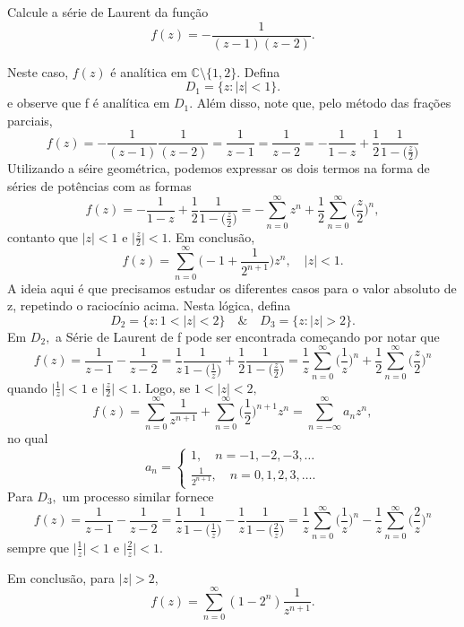 \documentclass[ComplexAnalysis/complex.tex]{subfiles}
\begin{document}
\begin{example}
	Calcule a série de Laurent da função
	\[
		f(z) = -\frac{1}{(z-1)(z-2)}.
	\]

	Neste caso, \(f(z)\) é analítica em \(\mathbb{C}\setminus{\{1, 2\}}.\) Defina
	\[
		D_{1} = \{z:|z| < 1\}.
	\]
	e observe que f é analítica em \(D_{1}.\) Além disso, note que, pelo método das frações parciais,
	\[
		f(z) = -\frac{1}{(z-1)}\frac{1}{(z-2)} = \frac{1}{z-1} = \frac{1}{z-2} = -\frac{1}{1-z} + \frac{1}{2}\frac{1}{1-\bigl(\frac{z}{2}\bigr)}
	\]
	Utilizando a séire geométrica, podemos expressar os dois termos na forma de séries de potências com as formas
	\[
		f(z) = -\frac{1}{1-z} + \frac{1}{2}\frac{1}{1-\bigl(\frac{z}{2}\bigr)} = -\sum\limits_{n=0}^{\infty}z^{n} + \frac{1}{2}\sum\limits_{n=0}^{\infty}\biggl(\frac{z}{2}\biggr)^{n},
	\]
	contanto que \(|z| < 1\) e \(\biggl\vert \frac{z}{2}\biggr\vert < 1.\) Em conclusão,
	\[
		f(z) = \sum\limits_{n=0}^{\infty}\biggl(-1 + \frac{1}{2^{n+1}}\biggr)z^{n},\quad |z|<1.
	\]
	A ideia aqui é que precisamos estudar os diferentes casos para o valor absoluto de z, repetindo o raciocínio acima. Nesta lógica, defina
	\[
		D_{2} = \{z: 1 < |z| < 2\}\quad\&\quad D_{3} = \{z: |z| > 2\}.
	\]
	Em \(D_{2},\) a Série de Laurent de f pode ser encontrada começando por notar que
	\[
		f(z) = \frac{1}{z-1} - \frac{1}{z-2} = \frac{1}{z}\frac{1}{1-\bigl(\frac{1}{z}\bigr)} + \frac{1}{2}\frac{1}{1-\bigl(\frac{z}{2}\bigr)} = \frac{1}{z}\sum\limits_{n=0}^{\infty}\biggl(\frac{1}{z}\biggr)^{n} + \frac{1}{2}\sum\limits_{n=0}^{\infty}\biggl(\frac{z}{2}\biggr)^{n}
	\]
	quando \(\biggl\vert\frac{1}{z}\biggr\vert < 1\) e \(\biggl\vert \frac{z}{2}\biggr\vert < 1.\) Logo, se \(1 < |z| < 2,\)
	\[
		f(z) = \sum\limits_{n=0}^{\infty}\frac{1}{z^{n+1}} + \sum\limits_{n=0}^{\infty}\biggl(\frac{1}{2}\biggr)^{n+1}z^{n} = \sum\limits_{n=-\infty}^{\infty}a_{n}z^{n},
	\]
	no qual
	\[
		a_{n} = \left\{\begin{array}{ll}
			1,\quad n = -1, -2, -3, \dotsc \\
			\frac{1}{2^{n+1}},\quad n=0, 1, 2, 3,\dotsc .
		\end{array}\right.
	\]
	Para \(D_{3},\) um processo similar fornece
	\[
		f(z) = \frac{1}{z-1} - \frac{1}{z-2} = \frac{1}{z}\frac{1}{1-\bigl(\frac{1}{z}\bigr)} - \frac{1}{z}\frac{1}{1-\bigl(\frac{2}{z}\bigr)} = \frac{1}{z}\sum\limits_{n=0}^{\infty}\biggl(\frac{1}{z}\biggr)^{n} - \frac{1}{z}\sum\limits_{n=0}^{\infty}\biggl(\frac{2}{z}\biggr)^{n}
	\]
	sempre que \(\biggl\vert\frac{1}{z}\biggr\vert < 1\) e \(\biggl\vert \frac{2}{z}\biggr\vert < 1.\)

	Em conclusão, para \(|z| > 2,\)
	\[
		f(z) = \sum\limits_{n=0}^{\infty}(1-2^{n})\frac{1}{z^{n+1}}.
	\]
\end{example}
\end{document}

